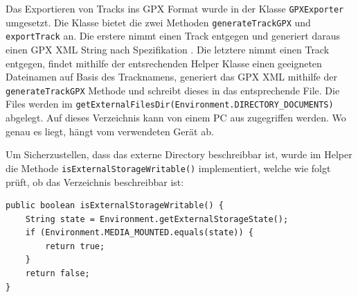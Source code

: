 Das Exportieren von Tracks ins GPX Format wurde in der Klasse \lstinline$GPXExporter$ umgesetzt. Die Klasse bietet die zwei Methoden \lstinline$generateTrackGPX$ und \lstinline$exportTrack$ an. Die erstere nimmt einen Track entgegen und generiert daraus einen GPX XML String nach Spezifikation \cite{gpx}. Die letztere nimmt einen Track entgegen, findet mithilfe der entsrechenden Helper Klasse einen geeigneten Dateinamen auf Basis des Tracknamens, generiert das GPX XML mithilfe der \lstinline$generateTrackGPX$ Methode und schreibt dieses in das entsprechende File. Die Files werden im \lstinline$getExternalFilesDir(Environment.DIRECTORY_DOCUMENTS)$ \cite{savingfiles} abgelegt. Auf dieses Verzeichnis kann von einem PC aus zugegriffen werden. Wo genau es liegt, hängt vom verwendeten Gerät ab. 

Um Sicherzustellen, dass das externe Directory beschreibbar ist, wurde im Helper die Methode \lstinline$isExternalStorageWritable()$ implementiert, welche wie folgt prüft, ob das Verzeichnis beschreibbar ist:

\begin{lstlisting}[caption={Die isExternalStorageWritable Methode}, label={lst:isexternalstoragewriteable}]
public boolean isExternalStorageWritable() {
    String state = Environment.getExternalStorageState();
    if (Environment.MEDIA_MOUNTED.equals(state)) {
        return true;
    }
    return false;
}
\end{lstlisting}